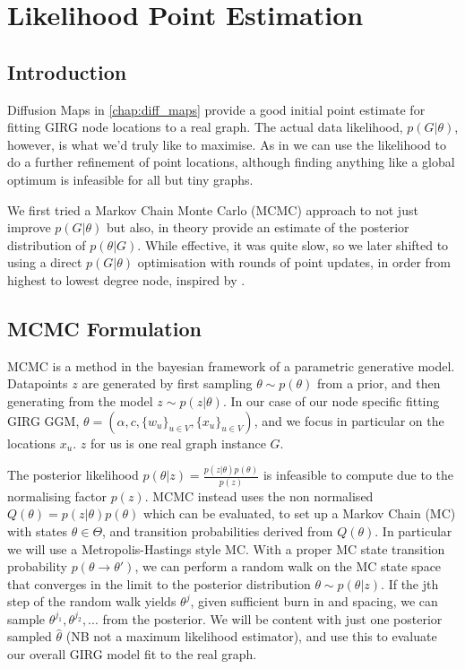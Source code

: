 \chapter{Likelihood Point Estimation}
\minitoc
\section{Introduction}
Diffusion Maps in \cref{chap:diff_maps} provide a good initial point estimate for fitting GIRG node locations to a real graph. The actual data likelihood, $p(G | \theta)$, however, is what we'd truly like to maximise. As in \cite{garcia2019mercator} we can use the likelihood to do a further refinement of point locations, although finding anything like a global optimum is infeasible for all but tiny graphs.

We first tried a Markov Chain Monte Carlo (MCMC) approach to not just improve $p(G | \theta)$ but also, in theory provide an estimate of the posterior distribution of $p(\theta | G)$. While effective, it was quite slow, so we later shifted to using a direct $p(G | \theta)$ optimisation with rounds of point updates, in order from highest to lowest degree node, inspired by \cite{garcia2019mercator}.

\section{MCMC Formulation}
MCMC is a method in the bayesian framework of a parametric generative model. Datapoints $z$ are generated by first sampling $\theta \sim p(\theta)$ from a prior, and then generating from the model $z \sim p(z | \theta)$. In our case of our node specific fitting GIRG GGM, $\theta = (\alpha, c, \{w_u\}_{u \in V}, \{x_u\}_{u \in V})$, and we focus in particular on the locations $x_u$. $z$ for us is one real graph instance $G$.

The posterior likelihood $p(\theta | z) = \frac{p(z | \theta) p(\theta)}{p(z)}$ is infeasible to compute due to the normalising factor $p(z)$. MCMC instead uses the non normalised $Q(\theta) = p(z | \theta) p(\theta)$ which can be evaluated, to set up a Markov Chain (MC) with states $\theta \in \Theta$, and transition probabilities derived from $Q(\theta)$.
In particular we will use a Metropolis-Hastings style MC.
With a proper MC state transition probability $p(\theta \to \theta')$, we can perform a random walk on the MC state space that converges in the limit to the posterior distribution $\theta \sim p(\theta | z)$. If the jth step of the random walk yields $\theta^j$, given sufficient burn in and spacing, we can sample $\theta^{j_1}, \theta^{j_2}, ...$ from the posterior. We will be content with just one posterior sampled $\hat{\theta}$ (NB not a maximum likelihood estimator), and use this to evaluate our overall GIRG model fit to the real graph.

